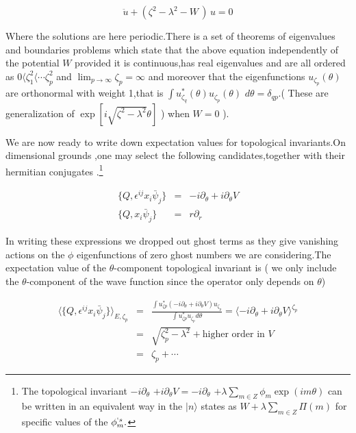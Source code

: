 \documentclass[a4paper,11pt]{article}
\begin{document}
\[
\ddot{u}+(\zeta ^{2}-\lambda ^{2}-W\,)\,u=0 
\]

Where the solutions are here periodic.There is a set of theorems of
eigenvalues and boundaries problems which state that the above equation
independently of the potential $W$ provided it is continuous,has real
eigenvalues and are all ordered as $0\langle \zeta _{1}^{2}\langle \cdots
\zeta _{p}^{2}$ and $\lim_{p\rightarrow \infty }\zeta _{p}=\infty $ and
moreover that the eigenfunctions $u_{\zeta _{p}}(\theta )$ are orthonormal
with weight 1,that is $\int u_{\zeta _{q}}^{\ast }(\theta )u_{\zeta
_{p}}(\theta )$ $d\theta =\delta _{qp}.$( These are generalization of $\exp
[i\sqrt{\zeta ^{2}-\lambda ^{2}}\theta ]$ ) when $W=0$ ).

We are now ready to write down expectation values for topological
invariants.On dimensional grounds ,one may select the following
candidates,together with their hermitian conjugates .\footnote{%
The topological invariant $-i\partial _{\theta }$ $+i\partial _{\theta
}V=-i\partial _{\theta }$ $+\lambda \sum_{m\in Z}\phi _{m}\exp (im\theta )$
can be written in an equivalent way in the $\mid n\rangle $ states as $%
W+\lambda \sum_{m\in Z}\Pi (m)$ for specific values of the $\phi _{m}^{`s}.$}

\begin{eqnarray*}
\{Q,\epsilon ^{ij}x_{i}\bar{\psi}_{j}\} &=&-i\partial _{\theta }+i\partial
_{\theta }V \\
\{Q,x_{i}\bar{\psi}_{j}\} &=&r\partial _{r}
\end{eqnarray*}

In writing these expressions we dropped out ghost terms as they give
vanishing actions on the $\phi $ eigenfunctions of zero ghost numbers we are
considering.The expectation value of the $\theta $-component topological
invariant is ( we only include the $\theta $-component of the wave function
since the operator only depends on $\theta $)

\begin{eqnarray*}
\langle \{Q,\epsilon ^{ij}x_{i}\bar{\psi}_{j}\}\rangle _{E,\zeta _{p}} &=&%
\frac{\int u_{\zeta p}^{\ast }(-i\partial _{\theta }+i\partial _{\theta
}V)u_{\zeta _{p}}}{\int u_{\zeta p}^{\ast }u_{\zeta _{p}}d\theta }=\langle
-i\partial _{\theta }+i\partial _{\theta }V\rangle ^{\zeta _{p}} \\
&=&\sqrt{\zeta _{p}^{2}-\lambda ^{2}}+\textrm{higher order in }V \\
&=&\zeta _{p}+\cdots
\end{eqnarray*}
\end{document}
